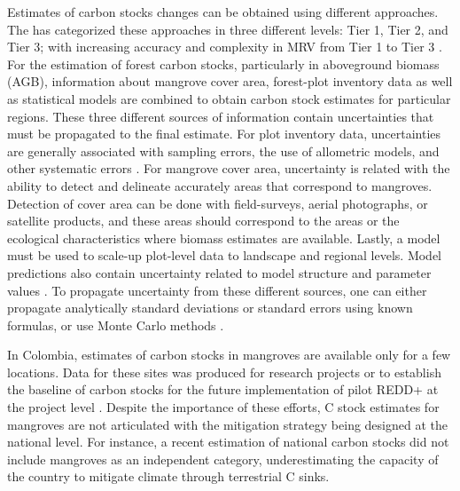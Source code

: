\documentclass[review, authoryear]{elsarticle}   	%
\begin{document}
Estimates of carbon stocks changes can be obtained using different approaches. The \citet{IPCC2003, IPCC2006} has categorized these approaches in three different levels: Tier 1, Tier 2, and Tier 3; with increasing accuracy and complexity in MRV from Tier 1 to Tier 3 \citep{Maniatis2010}. 
For the estimation of forest carbon stocks, particularly in aboveground biomass (AGB), information about mangrove cover area, forest-plot inventory data as well as statistical models are combined to obtain carbon stock estimates for particular regions. These three different sources of information contain uncertainties that must be propagated to the final estimate.  For plot inventory data, uncertainties are generally associated with sampling errors, the use of allometric models, and other systematic errors \citep{Chave2005, Sierra2007}. For mangrove cover area, uncertainty is related with the ability to detect and delineate accurately areas that correspond to mangroves. Detection of cover area can be done with field-surveys, aerial photographs, or satellite products, and these areas should correspond to the areas or the ecological characteristics where biomass estimates are available.  Lastly, a model must be used to scale-up plot-level data to landscape and regional levels. Model predictions also contain uncertainty related to model structure and parameter values \citep{IPCC2006}. To propagate uncertainty from these different sources, one can either propagate analytically standard deviations or standard errors using known formulas, or use Monte Carlo methods \citep{Chave2005, Sierra2007, IPCC2006}.


In Colombia, estimates of carbon stocks in mangroves are available only for a few locations. Data for these sites was produced for research projects or to establish the baseline of carbon stocks for the future implementation of pilot REDD+ at the project level \citep{Yepes2016, Malaga2015}. Despite the importance of these efforts, C stock estimates for mangroves are not articulated with the mitigation strategy being designed at the national level. For instance,  a recent estimation of national carbon stocks \citep{Phillips2011} did not include mangroves as an independent category, underestimating the capacity of the country to mitigate climate through terrestrial C sinks.
\end{document}
